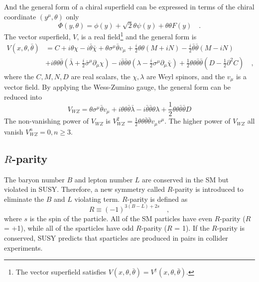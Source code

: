 %
And the general form of a chiral superfield can be expressed in terms of the chiral coordinate $(y^{\mu}, \theta)$ only
%
\begin{equation}
    \Phi(y, \theta) = \phi(y) + \sqrt{2} \theta \psi(y) + \theta \theta F(y) \quad .
    \label{eq:susy_chiral_superfield_general_form}
\end{equation}
%
The vector superfield, $V$, is a real field\footnote{The vector superfield satisfies $V(x, \theta, \bar{\theta}) = V^{\dagger}(x, \theta, \bar{\theta})$.} and the general form is
%
\begin{equation}
    \begin{aligned}
        V(x, \theta, \bar{\theta}) &= C + i \theta \chi - i \bar{\theta} \bar{\chi} + \theta \sigma^{\mu} \bar{\theta} v_{\mu} + \frac{i}{2} \theta \theta (M + iN) - \frac{i}{2} \bar{\theta} \bar{\theta}(M - iN)\\
        &+ i \theta \theta \bar{\theta} (\bar{\lambda} + \frac{i}{2} \bar{\sigma}^{\mu} \partial_{\mu} \chi) - i \bar{\theta} \bar{\theta} \theta (\lambda - \frac{i}{2} \sigma^{\mu} \partial_{\mu} \bar{\chi}) + \frac{1}{2} \theta \theta \bar{\theta} \bar{\theta} (D - \frac{1}{2} \partial^{2} C) \quad ,
        \label{eq:susy_vector_superfield_general_form}
    \end{aligned}
\end{equation}
%
where the $C, M, N, D$ are real scalars, the $\chi, \lambda$ are Weyl spinors, and the $v_{\mu}$ is a vector field.
By applying the Wess-Zumino gauge, the general form can be reduced into
%
\begin{equation}
    V_{WZ} = \theta \sigma^{\mu} \bar{\theta} v_{\mu} + i \theta \theta \bar{\theta} \bar{\lambda} - i \bar{\theta} \bar{\theta} \theta \lambda + \frac{1}{2} \theta \theta \bar{\theta} \bar{\theta} D
    \label{eq:susy_vector_superfield_reduced_form}
\end{equation}
%
The non-vanishing power of $V_{WZ}$ is $V^{2}_{WZ} = \frac{1}{2} \theta \theta \bar{\theta} \bar{\theta} v_{\mu} v^{\mu}$.
The higher power of $V_{WZ}$ all vanish $V^{n}_{WZ} = 0, n \ge 3$.


\subsection{$R$-parity}
\label{subsec:susy_r_parity}
The baryon number $B$ and lepton number $L$ are conserved in the SM but violated in SUSY.
Therefore, a new symmetry called $R$-parity is introduced to eliminate the $B$ and $L$ violating term.
$R$-parity is defined as
%
\begin{equation}
    R \equiv (-1)^{3(B-L)+2s} \quad ,
    \label{eq:susy_r_parity}
\end{equation}
%
where $s$ is the spin of the particle.
All of the SM particles have even $R$-parity ($R$ = +1), while all of the sparticles have odd $R$-parity ($R$ =  1). 
If the $R$-parity is conserved, SUSY predicts that sparticles are produced in pairs in collider experiments.

